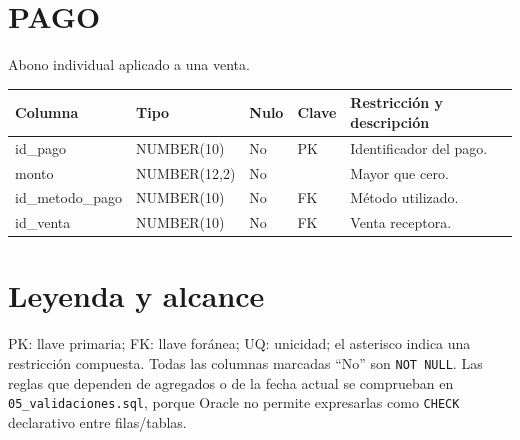 \documentclass[9pt,letterpaper]{article}
\newcommand{\tabla}[2]{\section*{#1}\textcolor{muted}{#2}\par\smallskip}
\newenvironment{dic}{\begin{longtable}{>{\ttfamily}p{2.8cm}p{2.3cm}p{1.1cm}p{1.5cm}p{7.3cm}}\toprule Columna & Tipo & Nulo & Clave & Restricción y descripción\\\midrule\endhead}{\end{longtable}}
\begin{document}
\tabla{PAGO}{Abono individual aplicado a una venta.}
\begin{dic}id\_pago&NUMBER(10)&No&PK&Identificador del pago.\\monto&NUMBER(12,2)&No&&Mayor que cero.\\id\_metodo\_pago&NUMBER(10)&No&FK&Método utilizado.\\id\_venta&NUMBER(10)&No&FK&Venta receptora.\end{dic}

\section*{Leyenda y alcance}
PK: llave primaria; FK: llave foránea; UQ: unicidad; el asterisco indica una restricción compuesta. Todas las columnas marcadas ``No'' son \texttt{NOT NULL}. Las reglas que dependen de agregados o de la fecha actual se comprueban en \texttt{05\_validaciones.sql}, porque Oracle no permite expresarlas como \texttt{CHECK} declarativo entre filas/tablas.
\end{document}
